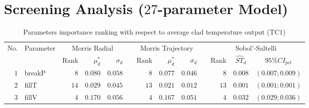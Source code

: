 \section{Screening Analysis ($27$-parameter Model)}\label{app:tbl_results_screening}

\begin{table*}[!htbp]\centering
{}
\caption{Parameters importance ranking with respect to average clad temperature output (TC$1$)}
\label{tab:app_screening_tc1_average}
\begin{tabular}{@{}rlrrrrrrrrrcc@{}}\toprule
\multirow{2}{*}{\footnotesize{No.}} & \multirow{2}{*}{\footnotesize{Parameter}} & \multicolumn{3}{c}{\footnotesize{Morris Radial}} & \phantom{a} & \multicolumn{3}{c}{\footnotesize{Morris Trajectory}}  &\phantom{a}& \multicolumn{3}{c}{\footnotesize{Sobol'-Saltelli}}                               \\             
                                                                                  \cmidrule{3-5}                                                   \cmidrule{7-9}                                                      \cmidrule{11-13}
                                    &                                           & \footnotesize{Rank}   & $\mu^*_d$ & $\sigma_d$   &             & \footnotesize{Rank} & $\mu^*_d$ & $\sigma_d$          &           & \footnotesize{Rank} & \footnotesize{$\hat{ST}_d$} & \footnotesize{$95\%CI_{pct}$}\\ \midrule
\footnotesize{$1 $} & \footnotesize{breakP   } & \footnotesize{$8 $} & \footnotesize{$0.080$} & \footnotesize{$0.058$} && \footnotesize{$8 $} & \footnotesize{$0.077$} & \footnotesize{$0.046$} && \footnotesize{$8 $} & \footnotesize{$0.008$} & \footnotesize{$(0.007;0.009)$} \\
\footnotesize{$2 $} & \footnotesize{fillT    } & \footnotesize{$14$} & \footnotesize{$0.029$} & \footnotesize{$0.045$} && \footnotesize{$13$} & \footnotesize{$0.021$} & \footnotesize{$0.012$} && \footnotesize{$13$} & \footnotesize{$0.001$} & \footnotesize{$(0.001;0.001)$} \\
\footnotesize{$3 $} & \footnotesize{fillV    } & \footnotesize{$4 $} & \footnotesize{$0.170$} & \footnotesize{$0.056$} && \footnotesize{$4 $} & \footnotesize{$0.167$} & \footnotesize{$0.051$} && \footnotesize{$4 $} & \footnotesize{$0.032$} & \footnotesize{$(0.029;0.036)$} \\

\end{tabular}
\end{table*}
